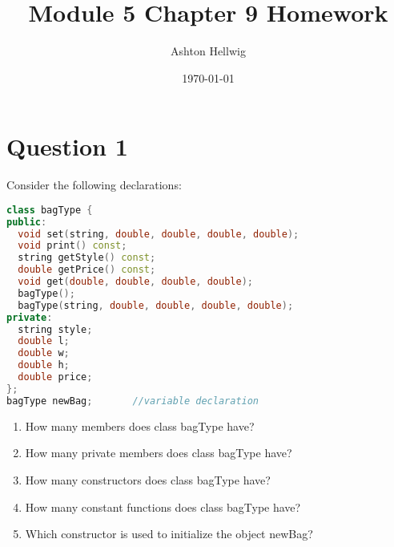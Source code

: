 \documentclass[a4paper, 10pt]{article}
\title{Module 5 Chapter 9 Homework}
\author{Ashton Hellwig}
\date\today
\begin{document}
  \maketitle
  \tableofcontents
  \lstlistoflistings
  \newpage

  \section{Question 1}
    Consider the following declarations:
    
      \begin{lstlisting}[language=c++,caption={Data Structure for \texttt{fruitType}}]
class bagType { 
public: 
  void set(string, double, double, double, double); 
  void print() const; 
  string getStyle() const; 
  double getPrice() const; 
  void get(double, double, double, double); 
  bagType(); 
  bagType(string, double, double, double, double); 
private: 
  string style; 
  double l; 
  double w; 
  double h; 
  double price; 
}; 
bagType newBag;       //variable declaration
      \end{lstlisting}
      
      \begin{enumerate}[label=\Alph*.]
          \item How many members does class bagType have?
          \item How many private members does class bagType have?
          \item How many constructors does class bagType have?
          \item How many constant functions does class bagType have?
          \item Which constructor is used to initialize the object newBag?
      \end{enumerate}
\end{document}
